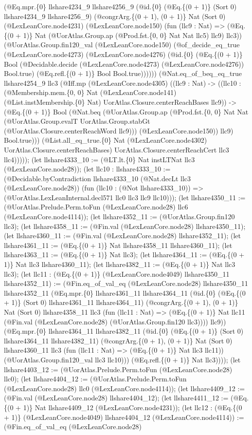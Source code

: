 \documentclass[11pt]{article}
\begin{document}
(@Eq.mpr.\{0\} llshare4234\_9 llshare4256\_9 (@id.\{0\} (@Eq.\{(0 + 1)\} (Sort 0) llshare4234\_9 llshare4256\_9) (@congrArg.\{(0 + 1), (0 + 1)\} Nat (Sort 0) (@LexLeanCore.node4231) (@LexLeanCore.node150) (fun (llc9 : Nat) => (@Eq.\{(0 + 1)\} Nat (@UorAtlas.Group.ap (@Prod.fst.\{0, 0\} Nat Nat llc5) llc9) llc3)) (@UorAtlas.Group.fin120\_val (@LexLeanCore.node150) (@of\_decide\_eq\_true (@LexLeanCore.node4273) (@LexLeanCore.node4276) (@id.\{0\} (@Eq.\{(0 + 1)\} Bool (@Decidable.decide (@LexLeanCore.node4273) (@LexLeanCore.node4276)) Bool.true) (@Eq.refl.\{(0 + 1)\} Bool Bool.true)))))) (@Nat.eq\_of\_beq\_eq\_true llshare4254\_9 llc3 (@Iff.mp (@LexLeanCore.node4305) ((llc9 : Nat) -> ((llc10 : (@Membership.mem.\{0, 0\} Nat (@LexLeanCore.node141) (@List.instMembership.\{0\} Nat) UorAtlas.Closure.centerReachBases llc9)) -> (@Eq.\{(0 + 1)\} Bool (@Nat.beq (@UorAtlas.Group.ap (@Prod.fst.\{0, 0\} Nat Nat (@UorAtlas.Group.evalT UorAtlas.Group.stabGt (@UorAtlas.Closure.centerReachWord llc9))) (@LexLeanCore.node150)) llc9) Bool.true))) (@List.all\_eq\_true.\{0\} Nat (@LexLeanCore.node4302) UorAtlas.Closure.centerReachBases) UorAtlas.Closure.centerReachCert llc3 llc4))))); (let llshare4333\_10 := (@LT.lt.\{0\} Nat instLTNat llc3 (@LexLeanCore.node28)); (let llc10 : llshare4333\_10 := (@Decidable.byContradiction llshare4333\_10 (@Nat.decLt llc3 (@LexLeanCore.node28)) (fun (llc10 : (@Not llshare4333\_10)) => (@UorAtlas.LexLeanInternal.decl571 llc0 llc3 llc9 llc10))); (let llshare4350\_11 := (@UorAtlas.Prelude.Perm.toFun (@LexLeanCore.node28) llc6 (@LexLeanCore.node4114)); (let llshare4352\_11 := (@UorAtlas.Group.fin120 llc3); (let llshare4358\_11 := (@Fin.val (@LexLeanCore.node28) llshare4350\_11); (let llshare4360\_11 := (@Fin.val (@LexLeanCore.node28) llshare4352\_11); (let llshare4361\_11 := (@Eq.\{(0 + 1)\} Nat llshare4358\_11 llshare4360\_11); (let llshare4363\_11 := (@Eq.\{(0 + 1)\} Nat llc3); (let llshare4364\_11 := (@Eq.\{(0 + 1)\} Nat llc3 llshare4360\_11); (let llshare4382\_11 := (@Eq.\{(0 + 1)\} Nat llc3 llc3); (let llc11 : (@Eq.\{(0 + 1)\} (@LexLeanCore.node4049) llshare4350\_11 llshare4352\_11) := (@Fin.eq\_of\_val\_eq (@LexLeanCore.node28) llshare4350\_11 llshare4352\_11 (@Eq.mpr.\{0\} llshare4361\_11 llshare4364\_11 (@id.\{0\} (@Eq.\{(0 + 1)\} (Sort 0) llshare4361\_11 llshare4364\_11) (@congrArg.\{(0 + 1), (0 + 1)\} Nat (Sort 0) llshare4358\_11 llc3 (fun (llc11 : Nat) => (@Eq.\{(0 + 1)\} Nat llc11 (@Fin.val (@LexLeanCore.node28) (@UorAtlas.Group.fin120 llc3)))) llc9)) (@Eq.mpr.\{0\} llshare4364\_11 llshare4382\_11 (@id.\{0\} (@Eq.\{(0 + 1)\} (Sort 0) llshare4364\_11 llshare4382\_11) (@congrArg.\{(0 + 1), (0 + 1)\} Nat (Sort 0) llshare4360\_11 llc3 (fun (llc11 : Nat) => (@Eq.\{(0 + 1)\} Nat llc3 llc11)) (@UorAtlas.Group.fin120\_val llc3 llc10))) (@Eq.refl.\{(0 + 1)\} Nat llc3)))); (let llshare4403\_12 := (@UorAtlas.Prelude.Perm.toFun (@LexLeanCore.node28) llc0); (let llshare4404\_12 := (@UorAtlas.Prelude.Perm.toFun (@LexLeanCore.node28) llc0 (@LexLeanCore.node4114)); (let llshare4409\_12 := (@Fin.val (@LexLeanCore.node28) llshare4404\_12); (let llshare4411\_12 := (@Eq.\{(0 + 1)\} Nat llshare4409\_12 (@LexLeanCore.node4231)); (let llc12 : (@Eq.\{(0 + 1)\} (@LexLeanCore.node4049) llshare4404\_12 (@LexLeanCore.node4114)) := (@Fin.eq\_of\_val\_eq (@LexLeanCore.node28) 
\end{document}
